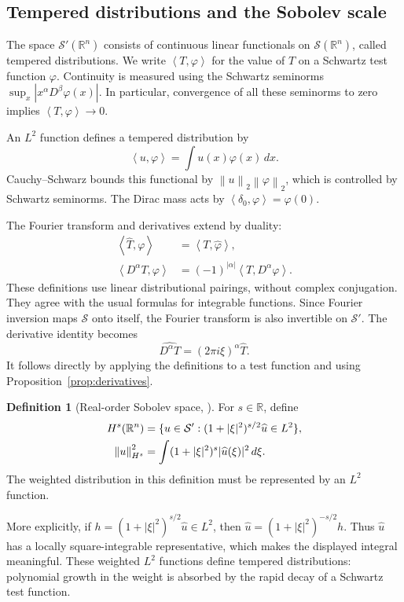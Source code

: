 \documentclass[11pt]{article}
\numberwithin{equation}{section}
\theoremstyle{definition}
\newtheorem{definition}[theorem]{Definition}
\theoremstyle{remark}
\newcommand{\R}{\mathbb R}
\newcommand{\Sch}{\mathcal S}
\newcommand{\dd}{\,d}
\newcommand{\norm}[1]{\left\|#1\right\|}
\newcommand{\ip}[2]{\left\langle #1,#2\right\rangle}
\newcommand{\wh}[1]{\widehat{#1}}
\begin{document}
\subsection{Tempered distributions and the Sobolev scale}
The space \(\Sch'(\R^n)\) consists of continuous linear functionals on \(\Sch(\R^n)\), called tempered distributions. We write \(\ip T\varphi\) for the value of \(T\) on a Schwartz test function \(\varphi\). Continuity is measured using the Schwartz seminorms
\(\sup_x|x^\alpha D^\beta\varphi(x)|\). In particular, convergence of all these seminorms to zero implies \(\ip T\varphi\to0\).

An \(L^2\) function defines a tempered distribution by
\[
 \ip u\varphi=\int u(x)\varphi(x)\dd x.
\]
Cauchy--Schwarz bounds this functional by \(\norm u_2\norm\varphi_2\), which is controlled by Schwartz seminorms. The Dirac mass acts by \(\ip{\delta_0}\varphi=\varphi(0)\).

The Fourier transform and derivatives extend by duality:
\begin{align*}
 \ip{\wh T}\varphi&=\ip T{\wh\varphi},\\
 \ip{D^\alpha T}\varphi&=(-1)^{|\alpha|}\ip T{D^\alpha\varphi}.
\end{align*}
These definitions use linear distributional pairings, without complex conjugation. They agree with the usual formulas for integrable functions. Since Fourier inversion maps \(\Sch\) onto itself, the Fourier transform is also invertible on \(\Sch'\). The derivative identity becomes
\begin{equation}\label{eq:distributionderivative}
 \wh{D^\alpha T}=(2\pi i\xi)^\alpha\wh T.
\end{equation}
It follows directly by applying the definitions to a test function and using Proposition~\ref{prop:derivatives}.

\begin{definition}[Real-order Sobolev space, {\cite[p.~2]{vese-sobolev}}]
For \(s\in\R\), define
\begin{align}
 H^s(\R^n)&=\{u\in\Sch':(1+|\xi|^2)^{s/2}\wh u\in L^2\},\notag\\
 \norm u_{H^s}^2&=\int(1+|\xi|^2)^s|\wh u(\xi)|^2\dd\xi.\label{eq:Hsdefinition}
\end{align}
The weighted distribution in this definition must be represented by an \(L^2\) function.
\end{definition}
More explicitly, if \(h=(1+|\xi|^2)^{s/2}\wh u\in L^2\), then
\(\wh u=(1+|\xi|^2)^{-s/2}h\). Thus \(\wh u\) has a locally square-integrable representative, which makes the displayed integral meaningful. These weighted \(L^2\) functions define tempered distributions: polynomial growth in the weight is absorbed by the rapid decay of a Schwartz test function.
\end{document}
